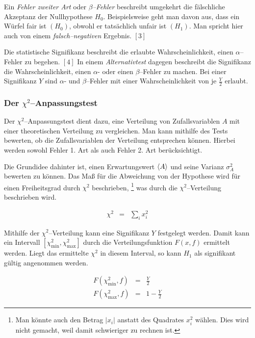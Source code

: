 \documentclass[12pt,a4paper]{scrartcl}
\numberwithin{equation}{section} %
\renewcommand{\[}{} %
\renewcommand{\]}{\noindent} %
\begin{document}
Ein \emph{Fehler zweiter Art} oder \emph{\(\beta\)--Fehler} beschreibt
umgekehrt die fälschliche Akzeptanz der Nullhypothese \(H_0\).
Beispielsweise geht man davon aus, dass ein Würfel fair ist \((H_0)\),
obwohl er tatsächlich unfair ist \((H_1)\). Man spricht hier auch von
einem \emph{falsch--negativen} Ergebnis. \([3]\)

Die statistische Signifikanz beschreibt die erlaubte Wahrscheinlichkeit,
einen \(\alpha\)--Fehler zu begehen. \([4]\) In einem
\emph{Alternativtest} dagegen beschreibt die Signifikanz die
Wahrscheinlichkeit, einen \(\alpha\)- oder einen \(\beta\)--Fehler zu
machen. Bei einer Signifikanz \(Y\) sind \(\alpha\)- und
\(\beta\)--Fehler mit einer Wahrscheinlichkeit von je \(\frac{Y}{2}\)
erlaubt.

\hypertarget{der-chi2anpassungstest}{%
\subsubsection{\texorpdfstring{Der
\(\chi^2\)--Anpassungstest}{Der \textbackslash chi\^{}2--Anpassungstest}}\label{der-chi2anpassungstest}}

Der \(\chi^2\)--Anpassungstest dient dazu, eine Verteilung von
Zufallsvariablen \(A\) mit einer theoretischen Verteilung zu
vergleichen. Man kann mithilfe des Tests bewerten, ob die
Zufallsvariablen der Verteilung entsprechen können. Hierbei werden
sowohl Fehler 1. Art als auch Fehler 2. Art berücksichtigt.

Die Grundidee dahinter ist, einen Erwartungswert \(\expval{A}\) und
seine Varianz \(\sigma_A^2\) bewerten zu können. Das Maß für die
Abweichung von der Hypothese wird für einen Freiheitsgrad durch
\(\chi^2\) beschrieben, \footnote{Man könnte auch den Betrag \(|x_i|\)
  anstatt des Quadrates \(x_i^2\) wählen. Dies wird nicht gemacht, weil
  damit schwieriger zu rechnen ist.} was durch die
\(\chi^2\)--Verteilung beschrieben wird.

\[
\begin{eqnarray}
    \chi^2 &=& \sum_i x_i^2
\end{eqnarray}
\]

Mithilfe der \(\chi^2\)--Verteilung kann eine Signifikanz \(Y\)
festgelegt werden. Damit kann ein Intervall
\([\chi^2_\mathrm{min}, \chi^2_\mathrm{max}]\) durch die
Verteilungsfunktion \(F(x, f)\) ermittelt werden. Liegt das ermittelte
\(\chi^2\) in diesem Interval, so kann \(H_1\) als signifikant gültig
angenommen werden.

\[
\begin{eqnarray}
    F(\chi^2_\mathrm{min}, f) &=& \frac{Y}{2} \\
    F(\chi^2_\mathrm{max}, f) &=& 1 - \frac{Y}{2}
\end{eqnarray}
\]
\end{document}
